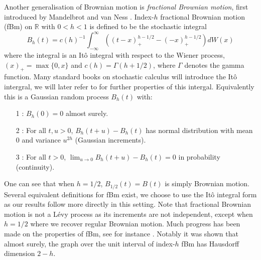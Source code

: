 Another generalisation of Brownian motion is \emph{fractional Brownian motion}, first introduced by Mandelbrot and van Ness \cite{MVN}. Index-$h$ fractional Brownian motion (fBm) on $\mathbb{R}$ with $0<h<1$ is defined to be the stochastic integral 
\[
B_h (t) = c(h)^{-1} \int_{-\infty}^\infty \left(\left( t-x \right)_+^{h-1/2} - (-x)_+^{h-1/2} \right)dW(x)
\]
where the integral is an It\^{o} integral with respect to the Wiener process, $(x)_+ = \max\{0,x\}$ and $c(h) = \Gamma(h+1/2)$, where $\Gamma$ denotes the gamma function. Many standard books on stochastic calculus will introduce the It\^{o} intergral, we will later refer to \cite{protter} for further properties of this intergal. Equivalently this is a Gaussian random process $B_h(t)$ with:
\begin{itemize}
	\item[1]: $B_h(0)=0$ almost surely.
	\item[2]: For all $t,u>0$, $B_h(t+u)-B_h(t)$ has normal distribution with mean 0 and variance $u^{2h}$ (Gaussian increments).
	\item[3]: For all $t>0$, $\lim_{u\to 0} B_h(t+u)-B_h(t)=0$ in probability (continuity).
\end{itemize}
One can see that when $h=1/2$, $B_{1/2}(t) = B(t)$ is simply Brownian motion. Several equivalent definitions for fBm exist, we choose to use the It\^{o} integral form as our results follow more directly in this setting. Note that fractional Brownian motion is not a L\'evy process as its increments are not independent, except when $h = 1/2$ where we recover regular Brownian motion. Much progress has been made on the properties of fBm, see for instance \cite{Ad, Ka, Fa2}. Notably it was shown that almost surely, the graph over the unit interval of index-$h$ fBm has Hausdorff dimension $2-h$. 

